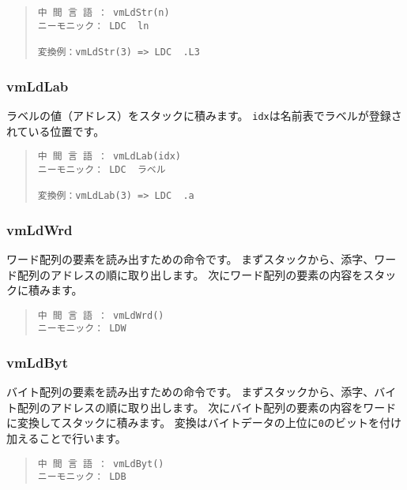 \begin{quote}
\begin{verbatim}
中 間 言 語 ： vmLdStr(n)
ニーモニック： LDC  ln   

変換例：vmLdStr(3) => LDC  .L3
\end{verbatim}
\end{quote}

\subsubsection{vmLdLab}

ラベルの値（アドレス）をスタックに積みます。
\verb/idx/は名前表でラベルが登録されている位置です。

\begin{quote}
\begin{verbatim}
中 間 言 語 ： vmLdLab(idx)
ニーモニック： LDC  ラベル

変換例：vmLdLab(3) => LDC  .a
\end{verbatim}
\end{quote}

\subsubsection{vmLdWrd}

ワード配列の要素を読み出すための命令です。
まずスタックから、添字、ワード配列のアドレスの順に取り出します。
次にワード配列の要素の内容をスタックに積みます。

\begin{quote}
\begin{verbatim}
中 間 言 語 ： vmLdWrd()
ニーモニック： LDW
\end{verbatim}
\end{quote}

\subsubsection{vmLdByt}

バイト配列の要素を読み出すための命令です。
まずスタックから、添字、バイト配列のアドレスの順に取り出します。
次にバイト配列の要素の内容をワードに変換してスタックに積みます。
変換はバイトデータの上位に\verb/0/のビットを付け加えることで行います。

\begin{quote}
\begin{verbatim}
中 間 言 語 ： vmLdByt()
ニーモニック： LDB
\end{verbatim}
\end{quote}

